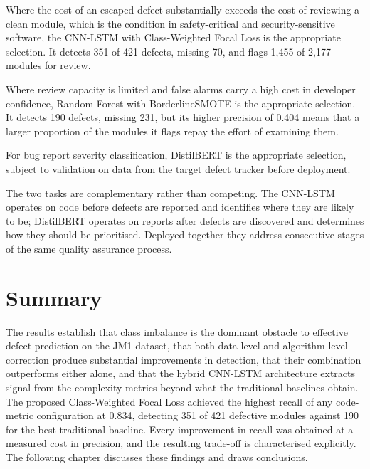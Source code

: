 \documentclass[12pt,a4paper,oneside]{report}
\begin{document}
Where the cost of an escaped defect substantially exceeds the cost of reviewing a clean module, which is the condition in safety-critical and security-sensitive software, the CNN-LSTM with Class-Weighted Focal Loss is the appropriate selection. It detects 351 of 421 defects, missing 70, and flags 1,455 of 2,177 modules for review.

Where review capacity is limited and false alarms carry a high cost in developer confidence, Random Forest with BorderlineSMOTE is the appropriate selection. It detects 190 defects, missing 231, but its higher precision of 0.404 means that a larger proportion of the modules it flags repay the effort of examining them.

For bug report severity classification, DistilBERT is the appropriate selection, subject to validation on data from the target defect tracker before deployment.

The two tasks are complementary rather than competing. The CNN-LSTM operates on code before defects are reported and identifies where they are likely to be; DistilBERT operates on reports after defects are discovered and determines how they should be prioritised. Deployed together they address consecutive stages of the same quality assurance process.

\section{Summary}

The results establish that class imbalance is the dominant obstacle to effective defect prediction on the JM1 dataset, that both data-level and algorithm-level correction produce substantial improvements in detection, that their combination outperforms either alone, and that the hybrid CNN-LSTM architecture extracts signal from the complexity metrics beyond what the traditional baselines obtain. The proposed Class-Weighted Focal Loss achieved the highest recall of any code-metric configuration at 0.834, detecting 351 of 421 defective modules against 190 for the best traditional baseline. Every improvement in recall was obtained at a measured cost in precision, and the resulting trade-off is characterised explicitly. The following chapter discusses these findings and draws conclusions.

\clearpage

\end{document}
